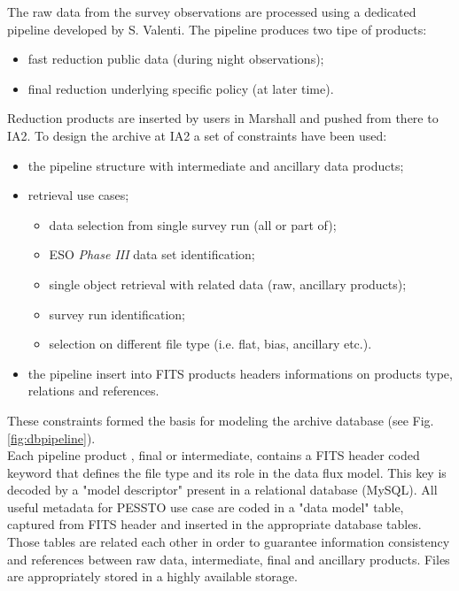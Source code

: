 The raw data from the survey observations are processed using a dedicated pipeline developed by S. Valenti. The pipeline produces two tipe of products:
\begin{itemize}[noitemsep,nolistsep]
	\item fast reduction public data (during night observations);
	\item final reduction underlying specific policy (at later time).
\end{itemize}
Reduction products are inserted by users in Marshall and pushed from there to IA2. 
To design the archive at IA2 a set of constraints have been used:
\begin{itemize}[noitemsep,nolistsep]
	\item the pipeline structure with intermediate and ancillary data products;
	\item retrieval use cases;
		\begin{itemize}[noitemsep,nolistsep]
			\item data selection from single survey run (all or part of);
			\item ESO \textit{Phase III} data set identification;
			\item single object retrieval with related data (raw, ancillary products);
			\item survey run identification;
			\item selection on different file type (i.e. flat, bias, ancillary etc.).
		\end{itemize}
	\item the pipeline insert into FITS products headers informations on products type, relations and references.
\end{itemize}
These constraints formed the basis for modeling the archive database (see Fig. \ref{fig:dbpipeline}).\\
Each pipeline product , final or intermediate, contains a FITS header coded keyword that defines the file type and its role in the data flux model. This key is decoded by a "model descriptor" present in a relational database (MySQL). All useful metadata for PESSTO use case are coded in a "data model" table, captured from FITS header and inserted in the appropriate database tables. Those tables are related each other in order to guarantee information consistency and references between raw data, intermediate, final and ancillary products. Files are appropriately stored in a highly available storage.


